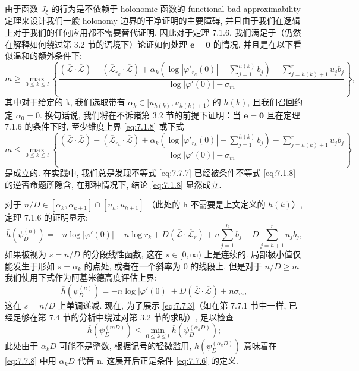 由于函数 \(J_{\xi}\) 的行为是不依赖于 holonomic 函数的 functional bad approximability 定理来设计我们一般 holonomy 边界的干净证明的主要障碍, 
并且由于我们在逻辑上对于我们的任何应用都不需要替代证明, 
因此对于定理 7.1.6, 我们满足于（仍然在解释如何绕过第 3.2 节的语境下）论证如何处理 \(\mathbf{e} = \mathbf{0}\) 的情况, 
并且是在以下看似温和的额外条件下:
\begin{equation}\label{eq:7.7.6}
m \ge \max_{0 \le k \le l} \left\{ \frac{\left(\overline{\mathcal{L}} \cdot \overline{\mathcal{L}}\right) - \left(\overline{\mathcal{L}}_{r_k} \cdot \overline{\mathcal{L}}\right) + \alpha_k \left(\log|\varphi'_{r_k}(0)| - \sum_{j=1}^{h(k)} b_j\right) - \sum_{j=h(k)+1}^r u_j b_j}{\log|\varphi'(0)| - \sigma_m} \right\},
\end{equation}
其中对于给定的 k, 我们选取带有 \(\alpha_k \in [u_{h(k)}, u_{h(k)+1})\) 的 \(h(k)\), 
且我们召回约定 \(\alpha_0 = 0\). 
换句话说, 我们将在不诉诸第 3.2 节的前提下证明：当 \(\mathbf{e} = \mathbf{0}\) 且在定理 7.1.6 的条件下时, 
至少维度上界 \eqref{eq:7.1.8} 或下式
\begin{equation}\label{eq:7.7.7}
m \leq \max_{0 \leq k \leq l} \left\{ \frac{\left(\overline{\mathcal{L}} \cdot \overline{\mathcal{L}}\right) - \left(\overline{\mathcal{L}}_{r_k} \cdot \overline{\mathcal{L}}\right) + \alpha_k \left(\log|\varphi'_{r_k}(0)| - \sum_{j=1}^{h(k)} b_j\right) - \sum_{j=h(k)+1}^r u_j b_j}{\log|\varphi'(0)| - \sigma_m} \right\}
\end{equation}
是成立的. 在实践中, 我们总是发现不等式 \eqref{eq:7.7.7} 已经被条件不等式 \eqref{eq:7.1.8} 的逆否命题所隐含, 
在那种情况下, 结论 \eqref{eq:7.1.8} 显然成立.

对于 \(n/D \in [\alpha_k, \alpha_{k+1}] \cap [u_h, u_{h+1}]\) （此处的 h 不需要是上文定义的 \(h(k)\)）, 
定理 7.1.6 的证明显示:
\begin{equation}\label{eq:7.7.8}
\overline{h}(\psi_D^{(n)}) = -n\log|\varphi'(0)| - n\log r_k + D(\overline{\mathcal{L}} \cdot \overline{\mathcal{L}}_r) + n\sum_{j=1}^h b_j + D\sum_{j=h+1}^r u_j b_j,
\end{equation}
如果被视为 \(s = n/D\) 的分段线性函数, 这在 \(s \in [0, \infty)\) 上是连续的. 
局部极小值仅能发生于形如 \(s = \alpha_k\) 的点处, 或者在一个斜率为 0 的线段上. 
但是对于 \(n/D \ge m\) 我们使用下式作为阿基米德高度评估上界:
\[ \overline{h}(\psi_D^{(n)}) = -n\log|\varphi'(0)| + D(\overline{\mathcal{L}} \cdot \overline{\mathcal{L}}) + n\sigma_m, \]
这在 \(s = n/D\) 上单调递减. 
现在, 为了展示 \eqref{eq:7.7.3}（如在第 7.7.1 节中一样, 已经足够在第 7.4 节的分析中绕过对第 3.2 节的求助）, 
足以检查
\[ \overline{h}(\psi_D^{(mD)}) \le \min_{0 \le k \le l} \overline{h}(\psi_D^{(\alpha_k D)}); \]
此处由于 \(\alpha_k D\) 可能不是整数, 根据记号的轻微滥用, 
\(\overline{h}(\psi_D^{(\alpha_k D)})\) 意味着在 \eqref{eq:7.7.8} 中用 \(\alpha_k D\) 代替 n. 
这展开后正是条件 \eqref{eq:7.7.6} 的定义.

